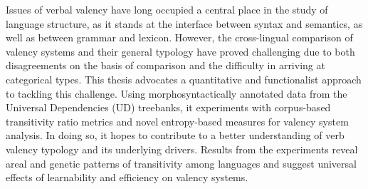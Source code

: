 
Issues of verbal valency have long occupied a central place in the study of language structure, as it stands at the interface between syntax and semantics, as well as between grammar and lexicon. However, the cross-lingual comparison of valency systems and their general typology have proved challenging due to both disagreements on the basis of comparison and the difficulty in arriving at categorical types. This thesis advocates a quantitative and functionalist approach to tackling this challenge. Using morphosyntactically annotated data from the Universal Dependencies (UD) treebanks, it experiments with corpus-based transitivity ratio metrics and novel entropy-based measures for valency system analysis. In doing so, it hopes to contribute to a better understanding of verb valency typology and its underlying drivers. Results from the experiments reveal areal and genetic patterns of transitivity among languages and suggest universal effects of learnability and efficiency on valency systems. 